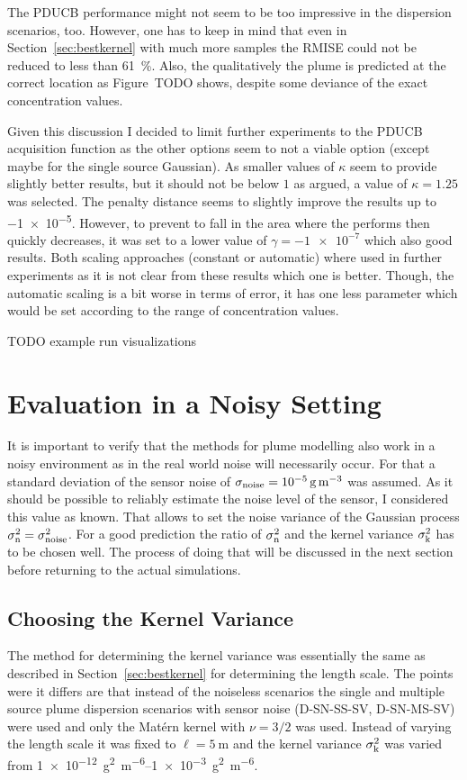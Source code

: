 The PDUCB performance might not seem to be too impressive in the dispersion 
scenarios, too. However, one has to keep in mind that even in 
Section~\ref{sec:bestkernel} with much more samples the RMISE could not be 
reduced to less than \SI{61}{\percent}.  Also, the qualitatively the plume is 
predicted at the correct location as Figure~TODO shows, despite some deviance of 
the exact concentration values.

Given this discussion I decided to limit further experiments to the PDUCB 
acquisition function as the other options seem to not a viable option (except 
maybe for the single source Gaussian). As smaller values of $\kappa$ seem to 
provide slightly better results, but it should not be below $1$ as argued, 
a value of $\kappa = 1.25$ was selected. The penalty distance seems to slightly 
improve the results up to \num{-1e-5}. However, to prevent to fall in the area 
where the performs then quickly decreases, it was set to a lower value of 
$\gamma = \num{-1e-7}$ which also good results. Both scaling approaches 
(constant or automatic) where used in further experiments as it is not clear 
from these results which one is better. Though, the automatic scaling is a bit 
worse in terms of error, it has one less parameter which would be set according 
to the range of concentration values.

TODO example run visualizations

\section{Evaluation in a Noisy Setting}\label{sec:noisy}
It is important to verify that the methods for plume modelling also work in 
a noisy environment as in the real world noise will necessarily occur. For that 
a standard deviation of the sensor noise of $\sigma_{\mathrm{noise}} 
= \SI{1e-5}{\gram\per\meter\cubed}$ was assumed. As it should be possible to 
reliably estimate the noise level of the sensor, I considered this value as 
known. That allows to set the noise variance of the Gaussian process 
$\sigma_{\mathrm{n}}^2 = \sigma_{\mathrm{noise}}^2$. For a good prediction the ratio of 
$\sigma_{\mathrm{n}}^2$ and the kernel variance $\sigma_{\mathrm{k}}^2$ has to be chosen 
well. The process of doing that will be discussed in the next section before 
returning to the actual simulations.

\subsection{Choosing the Kernel Variance}
The method for determining the kernel variance was essentially the same as 
described in Section~\ref{sec:bestkernel} for determining the length scale. The 
points were it differs are that instead of the noiseless scenarios the single 
and multiple source plume dispersion scenarios with sensor noise (D-SN-SS-SV, 
D-SN-MS-SV) were used and only the Mat\'ern kernel with $\nu = 3/2$ was used.  
Instead of varying the length scale it was fixed to $\ell = \SI{5}{\meter}$ and 
the kernel variance $\sigma_{\mathrm{k}}^2$ was varied from 
\SIrange{1e-12}{1e-3}{\gram\squared\per\meter\tothe{6}}.

